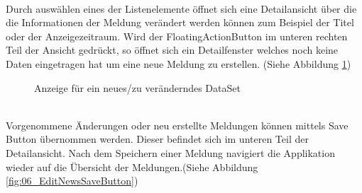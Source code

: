 \\
Durch auswählen eines der Listenelemente öffnet sich eine Detailansicht über die die Informationen der Meldung verändert werden können zum Beispiel der Titel oder der Anzeigezeitraum. Wird der FloatingActionButton im unteren rechten Teil der Ansicht gedrückt, so öffnet sich ein Detailfenster welches noch keine Daten eingetragen hat um eine neue Meldung zu erstellen. (Siehe Abbildung \ref{fig:06_NewNewsEdit})
\\
\begin{figure}[H]
    \centering
    \qquad
    \caption{Anzeige für ein neues/zu veränderndes DataSet}
    \label{fig:06_NewNewsEdit}
\end{figure}
\\
Vorgenommene Änderungen oder neu erstellte Meldungen können mittels Save Button übernommen werden. Dieser befindet sich im unteren Teil der Detailansicht. Nach dem Speichern einer Meldung navigiert die Applikation wieder auf die Übersicht der Meldungen.(Siehe Abbildung \ref{fig:06_EditNewsSaveButton})

